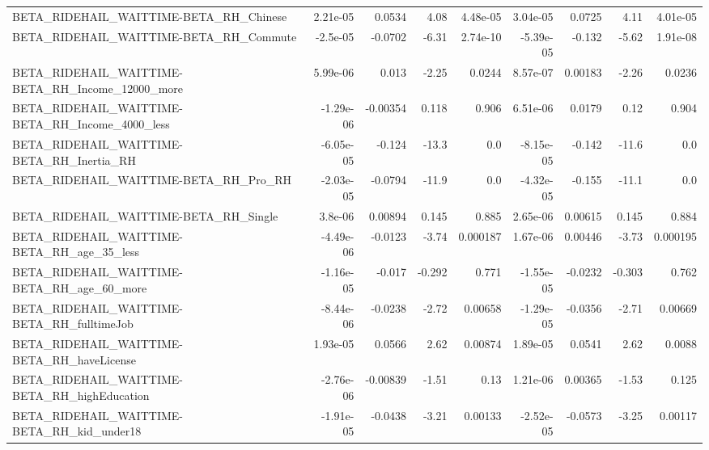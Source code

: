 \begin{tabular}{lrrrrrrrr}
BETA\_RIDEHAIL\_WAITTIME-BETA\_RH\_Chinese             &    2.21e-05 &       0.0534 &     4.08 & 4.48e-05 &   3.04e-05 &      0.0725 &         4.11 &      4.01e-05 \\
BETA\_RIDEHAIL\_WAITTIME-BETA\_RH\_Commute             &    -2.5e-05 &      -0.0702 &    -6.31 & 2.74e-10 &  -5.39e-05 &      -0.132 &        -5.62 &      1.91e-08 \\
BETA\_RIDEHAIL\_WAITTIME-BETA\_RH\_Income\_12000\_more   &    5.99e-06 &        0.013 &    -2.25 &   0.0244 &   8.57e-07 &     0.00183 &        -2.26 &        0.0236 \\
BETA\_RIDEHAIL\_WAITTIME-BETA\_RH\_Income\_4000\_less    &   -1.29e-06 &     -0.00354 &    0.118 &    0.906 &   6.51e-06 &      0.0179 &         0.12 &         0.904 \\
BETA\_RIDEHAIL\_WAITTIME-BETA\_RH\_Inertia\_RH          &   -6.05e-05 &       -0.124 &    -13.3 &      0.0 &  -8.15e-05 &      -0.142 &        -11.6 &           0.0 \\
BETA\_RIDEHAIL\_WAITTIME-BETA\_RH\_Pro\_RH              &   -2.03e-05 &      -0.0794 &    -11.9 &      0.0 &  -4.32e-05 &      -0.155 &        -11.1 &           0.0 \\
BETA\_RIDEHAIL\_WAITTIME-BETA\_RH\_Single              &     3.8e-06 &      0.00894 &    0.145 &    0.885 &   2.65e-06 &     0.00615 &        0.145 &         0.884 \\
BETA\_RIDEHAIL\_WAITTIME-BETA\_RH\_age\_35\_less         &   -4.49e-06 &      -0.0123 &    -3.74 & 0.000187 &   1.67e-06 &     0.00446 &        -3.73 &      0.000195 \\
BETA\_RIDEHAIL\_WAITTIME-BETA\_RH\_age\_60\_more         &   -1.16e-05 &       -0.017 &   -0.292 &    0.771 &  -1.55e-05 &     -0.0232 &       -0.303 &         0.762 \\
BETA\_RIDEHAIL\_WAITTIME-BETA\_RH\_fulltimeJob         &   -8.44e-06 &      -0.0238 &    -2.72 &  0.00658 &  -1.29e-05 &     -0.0356 &        -2.71 &       0.00669 \\
BETA\_RIDEHAIL\_WAITTIME-BETA\_RH\_haveLicense         &    1.93e-05 &       0.0566 &     2.62 &  0.00874 &   1.89e-05 &      0.0541 &         2.62 &        0.0088 \\
BETA\_RIDEHAIL\_WAITTIME-BETA\_RH\_highEducation       &   -2.76e-06 &     -0.00839 &    -1.51 &     0.13 &   1.21e-06 &     0.00365 &        -1.53 &         0.125 \\
BETA\_RIDEHAIL\_WAITTIME-BETA\_RH\_kid\_under18         &   -1.91e-05 &      -0.0438 &    -3.21 &  0.00133 &  -2.52e-05 &     -0.0573 &        -3.25 &       0.00117 \\

\end{tabular}
